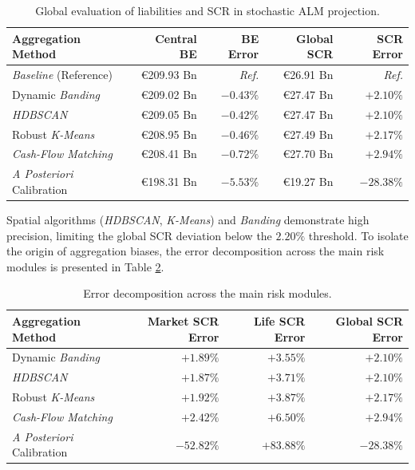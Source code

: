 \begin{table}[H]
    \centering
    \renewcommand{\arraystretch}{1.4}
    \begin{tabular}{|l|r|r|r|r|}
        \hline
        \textbf{Aggregation Method} & \textbf{Central BE} & \textbf{BE Error} & \textbf{Global SCR} & \textbf{SCR Error} \\
        \hline
        \textit{Baseline} (Reference) & €209.93 Bn & \textit{Ref.} & €26.91 Bn & \textit{Ref.} \\
        Dynamic \textit{Banding} & €209.02 Bn & $-0.43\%$ & €27.47 Bn & $+2.10\%$ \\
        \textit{HDBSCAN} & €209.05 Bn & $-0.42\%$ & €27.47 Bn & $+2.10\%$ \\
        Robust \textit{K-Means} & €208.95 Bn & $-0.46\%$ & €27.49 Bn & $+2.17\%$ \\
        \textit{Cash-Flow Matching} & €208.41 Bn & $-0.72\%$ & €27.70 Bn & $+2.94\%$ \\
        \textit{A Posteriori} Calibration & €198.31 Bn & $-5.53\%$ & €19.27 Bn & $-28.38\%$ \\
        \hline
    \end{tabular}
    \caption{Global evaluation of liabilities and SCR in stochastic ALM projection.}
    \label{tab:resultats_central_alm_english}
\end{table}

Spatial algorithms (\textit{HDBSCAN}, \textit{K-Means}) and \textit{Banding} demonstrate high precision, limiting the global SCR deviation below the $2.20\%$ threshold. To isolate the origin of aggregation biases, the error decomposition across the main risk modules is presented in Table \ref{tab:resultats_modules_english}.

\begin{table}[H]
    \centering
    \renewcommand{\arraystretch}{1.4}
    \begin{tabular}{|l|r|r|r|}
        \hline
        \textbf{Aggregation Method} & \textbf{Market SCR Error} & \textbf{Life SCR Error} & \textbf{Global SCR Error} \\
        \hline
        Dynamic \textit{Banding} & $+1.89\%$ & $+3.55\%$ & $+2.10\%$ \\
        \textit{HDBSCAN} & $+1.87\%$ & $+3.71\%$ & $+2.10\%$ \\
        Robust \textit{K-Means} & $+1.92\%$ & $+3.87\%$ & $+2.17\%$ \\
        \textit{Cash-Flow Matching} & $+2.42\%$ & $+6.50\%$ & $+2.94\%$ \\
        \textit{A Posteriori} Calibration & $-52.82\%$ & $+83.88\%$ & $-28.38\%$ \\
        \hline
    \end{tabular}
    \caption{Error decomposition across the main risk modules.}
    \label{tab:resultats_modules_english}
\end{table}

